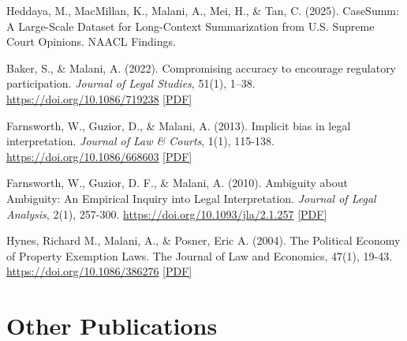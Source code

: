     \begin{tablist}

        \item[2025] \tab{}Heddaya, M., MacMillan, K., Malani, A., Mei, H., \& Tan, C. (2025). CaseSumm: A Large-Scale Dataset for Long-Context Summarization from U.S. Supreme Court Opinions. NAACL Findings. 
        
        \item[2022] \tab{}Baker, S., \& Malani, A. (2022). Compromising accuracy to encourage regulatory participation. \textit{Journal of Legal Studies}, 51(1), 1–38. \href{https://doi.org/10.1086/719238}{https://doi.org/10.1086/719238} \href{https://github.com/anup-malani/website_personal/blob/main/publications/2022_BakerMalani_JLS_CompromisingAccuracy.pdf}{[PDF]}
                    
        \item[2013] \tab{}Farnsworth, W., Guzior, D., \& Malani, A. (2013). Implicit bias in legal interpretation. \textit{Journal of Law \& Courts}, 1(1), 115-138. \href{https://doi.org/10.1086/668603}{https://doi.org/10.1086/668603} \href{https://github.com/anup-malani/website_personal/blob/main/publications/2013_FarnsworthGuziorMalani_PolicyPreferencesLegalInterpretation.pdf}{[PDF]} 
        
        \item[2010] \tab{}Farnsworth, W., Guzior, D. F., \& Malani, A. (2010). Ambiguity about Ambiguity: An Empirical Inquiry into Legal Interpretation. \textit{Journal of Legal Analysis}, 2(1), 257-300. \href{https://doi.org/10.1093/jla/2.1.257}{https://doi.org/10.1093/jla/2.1.257} \href{https://github.com/anup-malani/website_personal/blob/main/publications/2010_FarnsworthGuziorMalani_JLA_Ambiguity.pdf}{[PDF]}
    
        \item[2004] \tab{}Hynes, Richard M., Malani, A., \& Posner, Eric A. (2004). The Political Economy of Property Exemption Laws. The Journal of Law and Economics, 47(1), 19-43. \href{https://doi.org/10.1086/386276}{https://doi.org/10.1086/386276} \href{https://github.com/anup-malani/website_personal/blob/main/publications/2004_HynesMalaniPosner_JLE_PropertyExemptionLaws.pdf}{[PDF]}

    \end{tablist}

    \section*{Other Publications}

